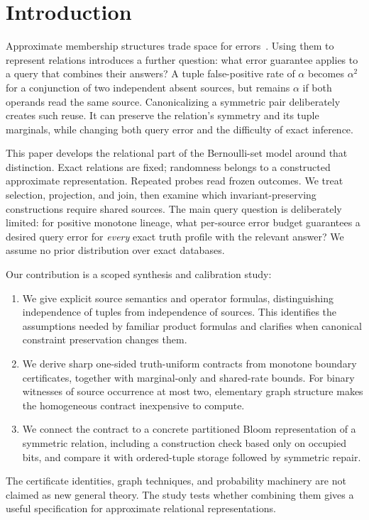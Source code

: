 \documentclass[../main.tex]{subfiles}
\begin{document}
\section{Introduction}
\label{sec:intro}
Approximate membership structures trade space for errors~\cite{bf}.
Using them to represent relations introduces a further question: what
error guarantee applies to a query that combines their answers? A tuple
false-positive rate of $\alpha$ becomes $\alpha^2$ for a conjunction of two
independent absent sources, but remains $\alpha$ if both operands read the
same source. Canonicalizing a symmetric pair deliberately creates such
reuse. It can preserve the relation's symmetry and its tuple marginals,
while changing both query error and the difficulty of exact inference.

This paper develops the relational part of the Bernoulli-set model
\cite{bernoulliSets} around that distinction. Exact relations are fixed;
randomness belongs to a constructed approximate representation. Repeated
probes read frozen outcomes. We treat selection, projection, and join, then
examine which invariant-preserving constructions require shared sources.
The main query question is deliberately limited: for positive monotone
lineage, what per-source error budget guarantees a desired query error for
\emph{every} exact truth profile with the relevant answer? We assume no
prior distribution over exact databases.

Our contribution is a scoped synthesis and calibration study:
\begin{enumerate}
\item We give explicit source semantics and operator formulas, distinguishing
independence of tuples from independence of sources. This identifies the
assumptions needed by familiar product formulas and clarifies when canonical
constraint preservation changes them.
\item We derive sharp one-sided truth-uniform contracts from monotone boundary
certificates, together with marginal-only and shared-rate bounds. For binary
witnesses of source occurrence at most two, elementary graph structure makes
the homogeneous contract inexpensive to compute.
\item We connect the contract to a concrete partitioned Bloom representation
of a symmetric relation, including a construction check based only on occupied
bits, and compare it with ordered-tuple storage followed by symmetric repair.
\end{enumerate}
The certificate identities, graph techniques, and probability machinery
are not claimed as new general theory. The study tests whether combining
them gives a useful specification for approximate relational representations.
\end{document}
